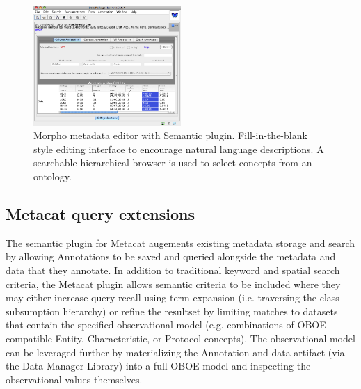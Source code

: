 \begin{figure}
\centering
\includegraphics[width=0.5\textwidth]{images/morpho-annotation.png}
\caption{Morpho metadata editor with Semantic plugin. Fill-in-the-blank style editing interface to encourage natural language descriptions. A searchable hierarchical browser is used to select concepts from an ontology.}
\label{fig:morpho-annotation}
\end{figure}

\subsection{Metacat query extensions}
The semantic plugin for Metacat augements existing metadata storage and search by allowing Annotations to be saved and queried alongside the metadata and data that they annotate. In addition to traditional keyword and spatial search criteria, the Metacat plugin allows semantic criteria to be included where they may either increase query recall using term-expansion (i.e. traversing the class subsumption hierarchy) or refine the resultset by limiting matches to datasets that contain the specified observational model (e.g. combinations of OBOE-compatible Entity, Characteristic, or Protocol concepts). The observational model can be leveraged further by materializing the Annotation and data artifact (via the Data Manager Library) into a full OBOE model and inspecting the observational values themselves. 

